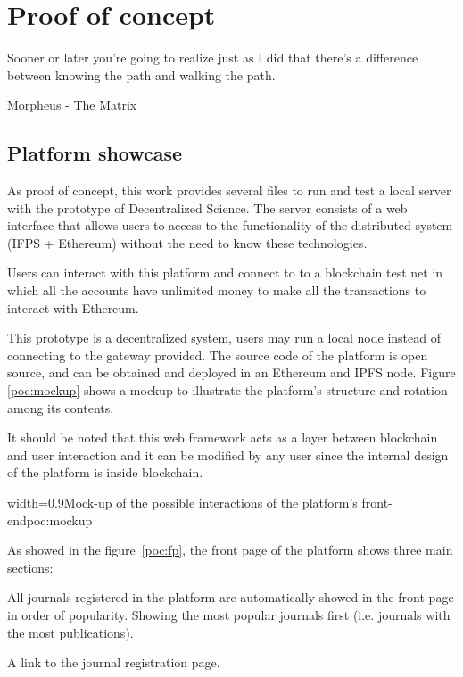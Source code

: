 \chapter{Proof of concept}
\label{poc}
\begin{FraseCelebre}
  \begin{Frase}
    Sooner or later you're going to realize just as I did that there's a
    difference between knowing the path and walking the path.
  \end{Frase}
  \begin{Fuente}
    Morpheus - The Matrix
  \end{Fuente}
\end{FraseCelebre}

\section{Platform showcase}

As proof of concept, this work provides several files to run and test a local
server with the prototype of Decentralized Science. The server consists of a web
interface that allows users to access to the functionality of the distributed
system (IFPS + Ethereum) without the need to know these technologies.

Users can interact with this platform and connect to to a blockchain test net in
which all the accounts have unlimited money to make all the transactions to
interact with Ethereum.

This prototype is a decentralized system, users may run a local node instead of
connecting to the gateway provided. The source code of the platform is open
source, and can be obtained and deployed in an Ethereum and IPFS node. Figure
\ref{poc:mockup} shows a mockup to illustrate the platform's structure and
rotation among its contents.

It should be noted that this web framework acts as a layer between blockchain
and user interaction and it can be modified by any user since the internal
design of the platform is inside blockchain.

 {width=0.9\linewidth}{Mock-up of the possible
  interactions of the platform's front-end}{poc:mockup}



As showed in the figure~\ref{poc:fp}, the front page of the platform shows three
main sections:

\begin{itemize}
   All journals registered in
  the platform are automatically showed in the front page in order of
  popularity. Showing the most popular journals first (i.e. journals with the
  most publications).

   A link to the journal registration page.

\end{itemize}


